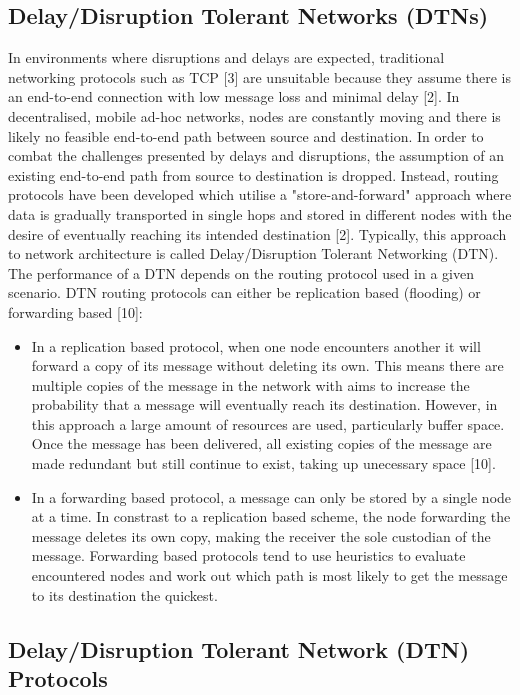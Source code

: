 \documentclass{article}
\begin{document}
\subsection{Delay/Disruption Tolerant Networks (DTNs)}
In environments where disruptions and delays are expected, traditional networking protocols such as TCP [3] are unsuitable because they assume there is an end-to-end connection with low message loss and minimal delay [2]. In decentralised, mobile ad-hoc networks, nodes are constantly moving and there is likely no feasible end-to-end path between source and destination. In order to combat the challenges presented by delays and disruptions, the assumption of an existing end-to-end path from source to destination is dropped. Instead, routing protocols have been developed which utilise a "store-and-forward" approach where data is gradually transported in single hops and stored in different nodes with the desire of eventually reaching its intended destination [2]. Typically, this approach to network architecture is called Delay/Disruption Tolerant Networking (DTN).\\
\noindent The performance of a DTN depends on the routing protocol used in a given scenario. DTN routing protocols can either be replication based (flooding) or forwarding based [10]:\\
\begin{itemize}
	\item In a replication based protocol, when one node encounters another it will forward a copy of its message without deleting its own. This means there are multiple copies of the message in the network with aims to increase the probability that a message will eventually reach its destination. However, in this approach a large amount of resources are used, particularly buffer space. Once the message has been delivered, all existing copies of the message are made redundant but still continue to exist, taking up unecessary space [10].
	\item In a forwarding based protocol, a message can only be stored by a single node at a time. In constrast to a replication based scheme, the node forwarding the message deletes its own copy, making the receiver the sole custodian of the message. Forwarding based protocols tend to use heuristics to evaluate encountered nodes and work out which path is most likely to get the message to its destination the quickest.
\end{itemize}
\newpage

\subsection{Delay/Disruption Tolerant Network (DTN) Protocols}
\end{document}
